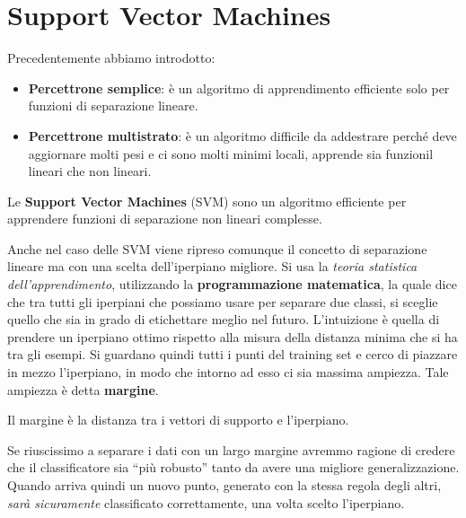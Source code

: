 \chapter{Support Vector Machines}
Precedentemente abbiamo introdotto:
\begin{itemize}
    \item \textbf{Percettrone semplice}: è un algoritmo di apprendimento efficiente
          solo per funzioni di separazione lineare.
    \item \textbf{Percettrone multistrato}: è un algoritmo difficile da addestrare
          perché deve aggiornare molti pesi e ci sono molti minimi locali, apprende
          sia funzionil lineari che non lineari.
\end{itemize}
Le \textbf{Support Vector Machines} (SVM) sono un algoritmo efficiente per
apprendere funzioni di separazione non lineari complesse.

Anche nel caso delle SVM viene ripreso comunque il concetto di separazione lineare
ma con una scelta dell'iperpiano migliore. Si usa la \textit{teoria statistica
    dell'apprendimento}, utilizzando la \textbf{programmazione matematica}, la quale
dice che tra tutti gli iperpiani che possiamo usare per separare due classi, si
sceglie quello che sia in grado di etichettare meglio nel futuro. L'intuizione
è quella di prendere un iperpiano ottimo rispetto alla misura della distanza minima
che si ha tra gli esempi. Si guardano quindi tutti i punti del training set e
cerco di piazzare in mezzo l'iperpiano, in modo che intorno ad esso ci sia massima
ampiezza. Tale ampiezza è detta \textbf{margine}.
\begin{definizione}
    Il margine è la distanza tra i vettori di supporto e l'iperpiano.
\end{definizione}
Se riuscissimo a separare i dati con un largo margine avremmo ragione di credere
che il classificatore sia “più robusto” tanto da avere una migliore generalizzazione.
Quando arriva quindi un nuovo punto, generato con la stessa regola degli altri,
\textit{sarà sicuramente} classificato correttamente, una volta scelto l'iperpiano.

